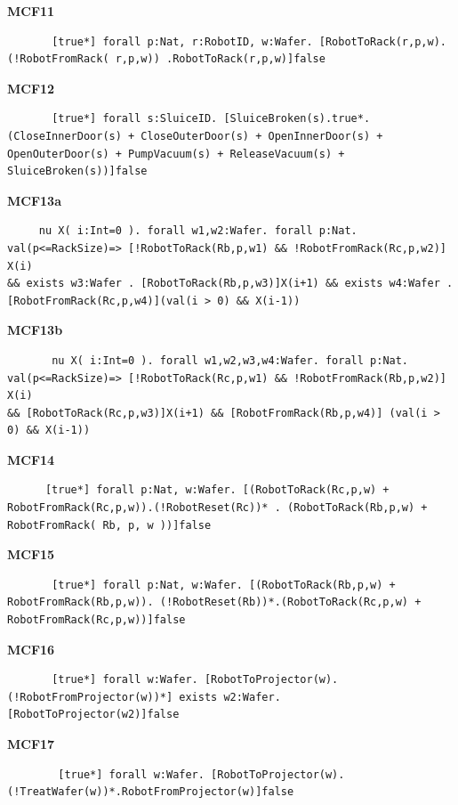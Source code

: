 \documentclass[12pt]{report}
\begin{document}
    \textbf{MCF11}
    \begin{lstlisting}
       [true*] forall p:Nat, r:RobotID, w:Wafer. [RobotToRack(r,p,w).(!RobotFromRack( r,p,w)) .RobotToRack(r,p,w)]false
    \end{lstlisting}

    \textbf{MCF12}
    \begin{lstlisting}
       [true*] forall s:SluiceID. [SluiceBroken(s).true*.(CloseInnerDoor(s) + CloseOuterDoor(s) + OpenInnerDoor(s) + OpenOuterDoor(s) + PumpVacuum(s) + ReleaseVacuum(s) + SluiceBroken(s))]false
    \end{lstlisting}

    \textbf{MCF13a}
    \begin{lstlisting}
     nu X( i:Int=0 ). forall w1,w2:Wafer. forall p:Nat. val(p<=RackSize)=> [!RobotToRack(Rb,p,w1) && !RobotFromRack(Rc,p,w2)] X(i) 
&& exists w3:Wafer . [RobotToRack(Rb,p,w3)]X(i+1) && exists w4:Wafer . [RobotFromRack(Rc,p,w4)](val(i > 0) && X(i-1))
    \end{lstlisting}

    \textbf{MCF13b}
    \begin{lstlisting}
       nu X( i:Int=0 ). forall w1,w2,w3,w4:Wafer. forall p:Nat. val(p<=RackSize)=> [!RobotToRack(Rc,p,w1) && !RobotFromRack(Rb,p,w2)] X(i) 
&& [RobotToRack(Rc,p,w3)]X(i+1) && [RobotFromRack(Rb,p,w4)] (val(i > 0) && X(i-1))
   \end{lstlisting}

    \textbf{MCF14}
    \begin{lstlisting}
      [true*] forall p:Nat, w:Wafer. [(RobotToRack(Rc,p,w) + RobotFromRack(Rc,p,w)).(!RobotReset(Rc))* . (RobotToRack(Rb,p,w) + RobotFromRack( Rb, p, w ))]false
    \end{lstlisting}

    \textbf{MCF15}
    \begin{lstlisting}
       [true*] forall p:Nat, w:Wafer. [(RobotToRack(Rb,p,w) + RobotFromRack(Rb,p,w)). (!RobotReset(Rb))*.(RobotToRack(Rc,p,w) + RobotFromRack(Rc,p,w))]false
    \end{lstlisting}

    \textbf{MCF16}
    \begin{lstlisting}
       [true*] forall w:Wafer. [RobotToProjector(w). (!RobotFromProjector(w))*] exists w2:Wafer. [RobotToProjector(w2)]false
    \end{lstlisting}

    \textbf{MCF17}
    \begin{lstlisting}
        [true*] forall w:Wafer. [RobotToProjector(w). (!TreatWafer(w))*.RobotFromProjector(w)]false
    \end{lstlisting}
\end{document}
